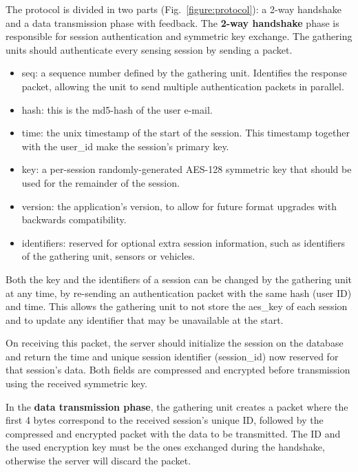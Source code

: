 The protocol is divided in two parts (Fig.~\ref{figure:protocol}): a 2-way handshake and a data transmission phase with feedback.
The \textbf{2-way handshake} phase is responsible for session authentication and symmetric key exchange.
The gathering units should authenticate every sensing session by sending a packet.



\begin{itemize}
\item seq: a sequence number defined by the gathering unit.
Identifies the response packet, allowing the unit to send multiple authentication packets in parallel.

\item hash: this is the md5-hash of the user e-mail.


\item time: the unix timestamp of the start of the session.
This timestamp together with the user\_id make the session's primary key.

\item key: a per-session randomly-generated AES-128 symmetric key that should be used for the remainder of the session.


\item version: the application's version, to allow for future format upgrades with backwards compatibility.

\item identifiers: reserved for optional extra session information, such as identifiers of the gathering unit, sensors or vehicles.
\end{itemize}

Both the key and the identifiers of a session can be changed by the gathering unit at any time, by re-sending an authentication packet with the same hash (user ID) and time.
This allows the gathering unit to not store the aes\_key of each session and to update any identifier that may be unavailable at the start.

On receiving this packet, the server should initialize the session on the database and return the time and unique session identifier (session\_id) now reserved for that session's data.
Both fields are compressed and encrypted before transmission using the received symmetric key.



In the \textbf{data transmission phase}, the gathering unit creates a packet where the first 4 bytes correspond to the received session's unique ID, followed by the compressed and encrypted packet with the data to be transmitted.
The ID and the used encryption key must be the ones exchanged during the handshake, otherwise the server will discard the packet.

